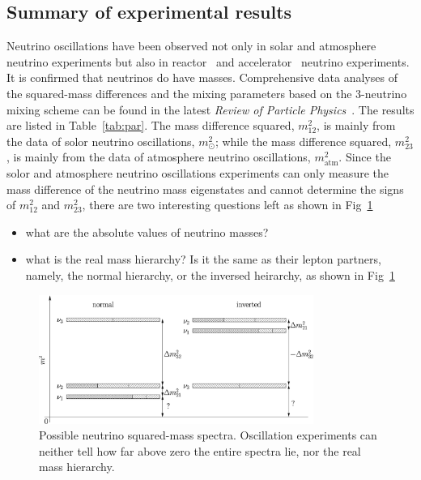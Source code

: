 \subsection{Summary of experimental results}
\label{sec:allo}
Neutrino oscillations have been observed not only in solar and
atmosphere neutrino experiments but also in reactor~\cite{Ara05} and
accelerator~\cite{Dod06,Agu07} neutrino experiments. It is confirmed
that neutrinos do have masses. Comprehensive data analyses of the
squared-mass differences and the mixing parameters based on the
3-neutrino mixing scheme can be found in the latest \emph{Review of  
Particle Physics}~\cite{PDG07}. The results are listed in
Table~\ref{tab:par}. The mass difference squared, $m^{2}_{12}$, is
mainly from the data of solor neutrino oscillations, $m^{2}_\odot$;
while the mass difference squared, $m^{2}_{23}$, is mainly from the
data of atmosphere neutrino oscillations, $m^{2}_{\mbox{atm}}$. Since
the solor and atmosphere neutrino oscillations experiments can only
measure the mass difference of the neutrino mass eigenstates and
cannot determine the signs of $m^{2}_{12}$ and $m^{2}_{23}$, there are
two interesting questions left as shown in Fig~\ref{fig:hie}
\begin{itemize}
\item what are the absolute values of neutrino masses?
\item what is the real mass hierarchy? Is it the same as their lepton
partners, namely, the normal hierarchy, or the inversed heirarchy, as
shown in Fig~\ref{fig:hie}
\end{itemize}
\begin{figure}[tbhp]
  \centering
  \includegraphics[width=0.8\textwidth]{massHierarchy.eps}  
  \caption{Possible neutrino squared-mass spectra. Oscillation    
experiments can neither tell how far above zero the entire spectra    
lie, nor the real mass hierarchy.}
  \label{fig:hie}
\end{figure}

